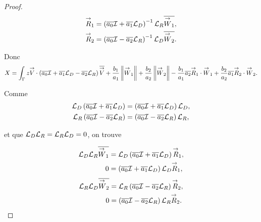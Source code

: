 \begin{proof}
    \begin{align*}
      \vR_1 & = \left(\conj{a_0}\oI  + \conj{a_1} \LD \right)^{-1}\LR \conj{\vW_1},
      \\
      \vR_2 & = \left(\conj{a_0}\oI  - \conj{a_2} \LR \right)^{-1}\LD \conj{\vW_2}.
    \end{align*}

    Donc 
    \begin{equation*}
      X = \int_\Gamma z \vV \cdot \left(\conj{a_0}\oI  + \conj{a_1} \LD - \conj{a_2}\LR\right)\conj{\vV} + \frac{b_1}{a_1} \norm{\vW_1} +\frac{b_2}{a_2} \norm{\vW_2} - \frac{b_1}{a_1}\conj{a_2}\vR_1\cdot\vW_1 + \frac{b_2}{a_2}\conj{a_1}\vR_2\cdot\vW_2.
    \end{equation*}

    Comme
    \begin{align*}
      \LD\left(\conj{a_0}\oI  + \conj{a_1} \LD \right)&=\left(\conj{a_0}\oI  + \conj{a_1} \LD \right)\LD,
      \\
      \LR\left(\conj{a_0}\oI  - \conj{a_2} \LR \right)&=\left(\conj{a_0}\oI  - \conj{a_2} \LR \right)\LR,
    \end{align*}

    et que \(\LD\LR=\LR\LD=0\), on trouve

    \begin{equation*}
      \begin{aligned}
        \LD\LR\conj{\vW_1} &= \LD\left(\conj{a_0}\oI  + \conj{a_1} \LD \right)\vR_1,
        \\
        0 & =\left(\conj{a_0}\oI  + \conj{a_1} \LD \right)\LD\vR_1,
      \end{aligned}
    \end{equation*}
    \begin{equation*}
      \begin{aligned}
        \LR\LD\conj{\vW_2} &= \LR\left(\conj{a_0}\oI  - \conj{a_2} \LR \right)\vR_2,
        \\
        0 & =\left(\conj{a_0}\oI  - \conj{a_2} \LR \right)\LR\vR_2.
      \end{aligned}
    \end{equation*}



\end{proof}
